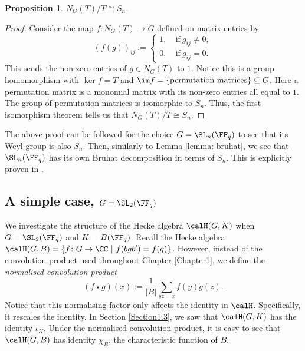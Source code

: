 \documentclass[11pt]{amsart}
\newtheorem{prop}[thm]{Proposition}
\theoremstyle{remark}
\begin{document}
\begin{prop}
	$N_G(T)/T \cong S_n$.
\end{prop}

\begin{proof}
	Consider the map $f\colon N_G(T)\to G$ defined on matrix entries by
	\[
		(f(g))_{ij} := \begin{cases}
			1,\  & \text{if}\ g_{ij}\neq 0, \\
			0,\  & \text{if}\ g_{ij}=0.
		\end{cases}
	\]
	This sends the non-zero entries of $g\in N_G(T)$ to $1$.
	Notice this is a group homomorphism with $\ker f = T$ and $\im f = \{\text{permutation matrices}\}\subseteq G$.
	Here a permutation matrix is a monomial matrix with its non-zero entries all equal to $1$.
	The group of permutation matrices is isomorphic to $S_n$.
	Thus, the first isomorphism theorem tells us that $N_G(T)/T \cong S_n$.
\end{proof}

The above proof can be followed for the choice $G=\SL_n(\FF_q)$ to see that its Weyl group is also $S_n$.
Then, similarly to Lemma \ref{lemma: bruhat}, we see that $\SL_n(\FF_q)$ has its own Bruhat decomposition in terms of $S_n$.
This is explicitly proven in \cite{Bump13}.


\subsection{A simple case, $G=\SL_2(\FF_q)$}\label{Section3.2}
We investigate the structure of the Hecke algebra $\calH(G,K)$ when $G=\SL_2(\FF_q)$ and $K=B(\FF_q)$.
Recall the Hecke algebra $\calH(G,B) = \{f\colon G\to\CC\ |\ f(bgb') = f(g)\}$.
However, instead of the convolution product used throughout Chapter \ref{Chapter1}, we define the \emph{normalised convolution product}
\[
	(f\star g)(x) := \frac{1}{|B|} \sum_{yz=x} f(y)g(z).
\]
Notice that this normalising factor only affects the identity in $\calH$.
Specifically, it rescales the identity.
In Section \ref{Section1.3}, we saw that $\calH(G,K)$ has the identity $\iota_K$.
Under the normalised convolution product, it is easy to see that $\calH(G,B)$ has identity $\chi_B$, the characteristic function of $B$.
\end{document}

